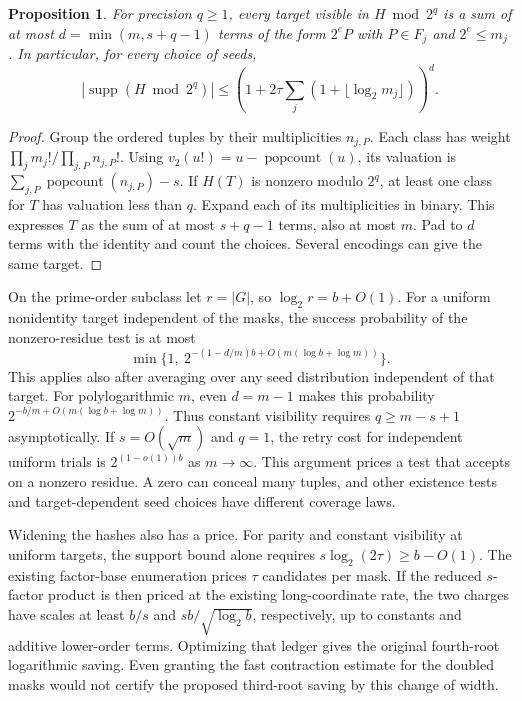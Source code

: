 \documentclass[11pt]{article}
\newtheorem{proposition}{Proposition}
\newcommand{\supp}{\operatorname{supp}}
\newcommand{\pc}{\operatorname{popcount}}
\begin{document}
\begin{proposition}
For precision $q\ge1$, every target visible in $H\bmod 2^q$ is a
sum of at most $d=\min(m,s+q-1)$ terms of the form $2^e P$ with
$P\in F_j$ and $2^e\le m_j$. In particular, for every choice of seeds,
\[
 |\supp(H\bmod 2^q)|\le
 \left(1+2\tau\sum_j(1+\lfloor\log_2 m_j\rfloor)\right)^d .
\]
\end{proposition}
\begin{proof}
Group the ordered tuples by their multiplicities $n_{j,P}$.
Each class has weight $\prod_j m_j!/\prod_{j,P}n_{j,P}!$. Using
$v_2(u!)=u-\pc(u)$, its valuation is
$\sum_{j,P}\pc(n_{j,P})-s$.
If $H(T)$ is nonzero modulo $2^q$, at least one class for $T$
has valuation less than $q$. Expand each of its multiplicities in
binary. This expresses $T$ as the sum of at most $s+q-1$ terms,
also at most $m$. Pad to $d$ terms with the identity and count the
choices. Several encodings can give the same target.
\end{proof}

On the prime-order subclass let $r=|G|$, so $\log_2 r=b+O(1)$.
For a uniform nonidentity target independent of the masks, the
success probability of the nonzero-residue test is at most
\[
 \min\{1,\ 2^{-(1-d/m)b+O(m(\log b+\log m))}\}.
\]
This applies also after averaging over any seed distribution independent
of that target. For polylogarithmic $m$, even $d=m-1$ makes this
probability $2^{-b/m+O(m(\log b+\log m))}$. Thus constant visibility
requires $q\ge m-s+1$ asymptotically. If $s=O(\sqrt m)$ and $q=1$,
the retry cost for independent uniform trials is $2^{(1-o(1))b}$
as $m\to\infty$. This argument prices a test that accepts on a
nonzero residue. A zero can conceal many tuples, and other existence
tests and target-dependent seed choices have different coverage laws.

Widening the hashes also has a price. For parity and constant
visibility at uniform targets, the support bound alone requires
$s\log_2(2\tau)\ge b-O(1)$. The existing factor-base enumeration
prices $\tau$ candidates per mask. If the reduced $s$-factor
product is then priced at the existing long-coordinate rate,
the two charges have scales at least $b/s$ and
$s b/\sqrt{\log_2 b}$, respectively, up to constants and additive
lower-order terms. Optimizing that ledger gives the original
fourth-root logarithmic saving. Even granting the fast contraction
estimate for the doubled masks would not certify the proposed
third-root saving by this change of width.
\end{document}
